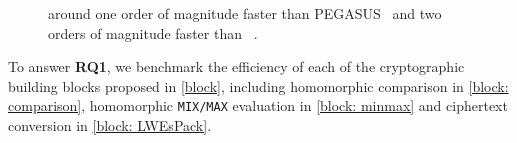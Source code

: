 \begin{figure}[t!]
\begin{minipage}[t]{0.5\linewidth}
{    around one order of magnitude faster than PEGASUS~\cite{pegasus}
    and two orders of magnitude faster than ~\cite{ckkscomparison}.}
    \label{fig: homsortbench}
    \end{minipage}
   
\end{figure}


To answer {\bf{RQ1}}, we benchmark the efficiency of each of the 
cryptographic building blocks proposed in \cref{block},
including homomorphic comparison in \cref{block: comparison}, 
homomorphic \texttt{MIX/MAX} evaluation in \cref{block: minmax}
and ciphertext conversion in \cref{block: LWEsPack}. 

